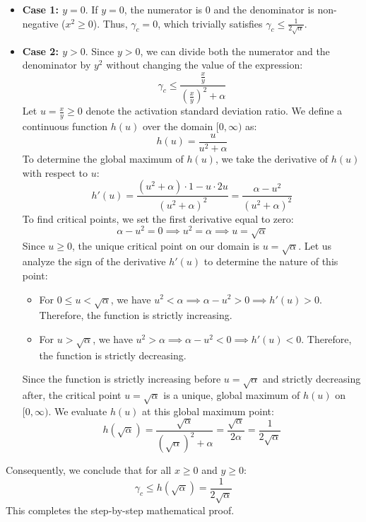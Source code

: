 \documentclass{article}
\theoremstyle{plain}
\theoremstyle{definition}
\theoremstyle{remark}
\begin{document}
\begin{itemize}
    \item \textbf{Case 1: $y = 0$}. If $y = 0$, the numerator is 0 and the denominator is non-negative ($x^2 \ge 0$). Thus, $\gamma_c = 0$, which trivially satisfies $\gamma_c \le \frac{1}{2\sqrt{\alpha}}$.
    \item \textbf{Case 2: $y > 0$}. Since $y > 0$, we can divide both the numerator and the denominator by $y^2$ without changing the value of the expression:
    \begin{equation}
    \gamma_c \le \frac{\frac{x}{y}}{\left(\frac{x}{y}\right)^2 + \alpha}
    \end{equation}
    Let $u = \frac{x}{y} \ge 0$ denote the activation standard deviation ratio. We define a continuous function $h(u)$ over the domain $[0, \infty)$ as:
    \begin{equation}
    h(u) = \frac{u}{u^2 + \alpha}
    \end{equation}
    To determine the global maximum of $h(u)$, we take the derivative of $h(u)$ with respect to $u$:
    \begin{equation}
    h'(u) = \frac{(u^2 + \alpha) \cdot 1 - u \cdot 2u}{(u^2 + \alpha)^2} = \frac{\alpha - u^2}{(u^2 + \alpha)^2}
    \end{equation}
    To find critical points, we set the first derivative equal to zero:
    \begin{equation}
    \alpha - u^2 = 0 \implies u^2 = \alpha \implies u = \sqrt{\alpha}
    \end{equation}
    Since $u \ge 0$, the unique critical point on our domain is $u = \sqrt{\alpha}$. Let us analyze the sign of the derivative $h'(u)$ to determine the nature of this point:
    \begin{itemize}
        \item For $0 \le u < \sqrt{\alpha}$, we have $u^2 < \alpha \implies \alpha - u^2 > 0 \implies h'(u) > 0$. Therefore, the function is strictly increasing.
        \item For $u > \sqrt{\alpha}$, we have $u^2 > \alpha \implies \alpha - u^2 < 0 \implies h'(u) < 0$. Therefore, the function is strictly decreasing.
    \end{itemize}
    Since the function is strictly increasing before $u = \sqrt{\alpha}$ and strictly decreasing after, the critical point $u = \sqrt{\alpha}$ is a unique, global maximum of $h(u)$ on $[0, \infty)$.
    We evaluate $h(u)$ at this global maximum point:
    \begin{equation}
    h(\sqrt{\alpha}) = \frac{\sqrt{\alpha}}{(\sqrt{\alpha})^2 + \alpha} = \frac{\sqrt{\alpha}}{2\alpha} = \frac{1}{2\sqrt{\alpha}}
    \end{equation}
\end{itemize}
Consequently, we conclude that for all $x \ge 0$ and $y \ge 0$:
\begin{equation}
\gamma_c \le h(\sqrt{\alpha}) = \frac{1}{2\sqrt{\alpha}}
\end{equation}
This completes the step-by-step mathematical proof. 
\end{document}
